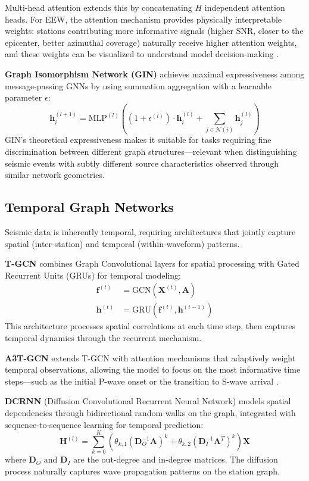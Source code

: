 \documentclass[review,authoryear]{elsarticle}
\begin{document}
Multi-head attention extends this by concatenating $H$ independent attention heads. For EEW, the attention mechanism provides physically interpretable weights: stations contributing more informative signals (higher SNR, closer to the epicenter, better azimuthal coverage) naturally receive higher attention weights, and these weights can be visualized to understand model decision-making \citep{vandenende2020automated}.

\textbf{Graph Isomorphism Network (GIN)} \citep{xu2019powerful} achieves maximal expressiveness among message-passing GNNs by using summation aggregation with a learnable parameter $\epsilon$:
\begin{equation}
\mathbf{h}_i^{(l+1)} = \text{MLP}^{(l)}\left((1 + \epsilon^{(l)}) \cdot \mathbf{h}_i^{(l)} + \sum_{j \in \mathcal{N}(i)} \mathbf{h}_j^{(l)}\right)
\end{equation}
GIN's theoretical expressiveness makes it suitable for tasks requiring fine discrimination between different graph structures---relevant when distinguishing seismic events with subtly different source characteristics observed through similar network geometries.

\subsection{Temporal Graph Networks}

Seismic data is inherently temporal, requiring architectures that jointly capture spatial (inter-station) and temporal (within-waveform) patterns.

\textbf{T-GCN} \citep{zhao2020tgcn} combines Graph Convolutional layers for spatial processing with Gated Recurrent Units (GRUs) for temporal modeling:
\begin{align}
\mathbf{f}^{(t)} &= \text{GCN}\left(\mathbf{X}^{(t)}, \mathbf{A}\right) \\
\mathbf{h}^{(t)} &= \text{GRU}\left(\mathbf{f}^{(t)}, \mathbf{h}^{(t-1)}\right)
\end{align}
This architecture processes spatial correlations at each time step, then captures temporal dynamics through the recurrent mechanism.

\textbf{A3T-GCN} extends T-GCN with attention mechanisms that adaptively weight temporal observations, allowing the model to focus on the most informative time steps---such as the initial P-wave onset or the transition to S-wave arrival \citep{bai2020adaptive}.

\textbf{DCRNN} (Diffusion Convolutional Recurrent Neural Network) \citep{li2018dcrnn} models spatial dependencies through bidirectional random walks on the graph, integrated with sequence-to-sequence learning for temporal prediction:
\begin{equation}
\mathbf{H}^{(l)} = \sum_{k=0}^{K} \left(\theta_{k,1} \left(\mathbf{D}_O^{-1}\mathbf{A}\right)^k + \theta_{k,2} \left(\mathbf{D}_I^{-1}\mathbf{A}^T\right)^k\right) \mathbf{X}
\end{equation}
where $\mathbf{D}_O$ and $\mathbf{D}_I$ are the out-degree and in-degree matrices. The diffusion process naturally captures wave propagation patterns on the station graph.
\end{document}
